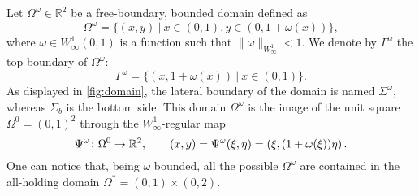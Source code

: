 \documentclass[final,hidelinks]{siamart1116Arxiv}
\numberwithin{theorem}{section}
\newcommand{\st}{{\ | \ }} %
\newcommand{\rd}[1]{%
  \IfEqCase{#1}{%
    {x}{\xi}%
    {y}{\eta}%
    {(x,y)}{(\xi,\eta)}%
  }[\PackageError{\rd}{Opzione non definita per rd: #1}{}]%
}
\newcommand{\allhold}{{\Omega^*}}
\begin{document}
Let $\Omega^\omega\in\mathbb{R}^2$ be a free-boundary, bounded domain defined as
\begin{equation}\label{eq:domain}
    \Omega^\omega = \{(x,y) \st x\in (0,1), y\in (0,1+\omega(x))\},
\end{equation}
where $\omega\in W^1_\infty(0,1)$ is a function such that $\|\omega\|_{W^1_\infty}<1$.
We denote by $\Gamma^\omega$ the top boundary of $\Omega^\omega$:
\begin{equation}
    \Gamma^\omega = \{(x,1+\omega(x)) \st x\in(0,1)\}.
\end{equation}
As displayed in \cref{fig:domain}, the lateral boundary of the domain is named $\Sigma^\omega$, whereas $\Sigma_b$ is the bottom side.
This domain $\Omega^\omega$ is the image of the unit square $\Omega^0=(0,1)^2$ through the $W^1_\infty$-regular map
\begin{equation}
    \Psi^\omega \colon \Omega^0 \to \mathbb{R}^2, \qquad (x,y) = \Psi^\omega(\rd{x},\rd{y}) = \left(\rd{x} , (1+\omega(\rd{x}))\rd{y}\right).
\end{equation}
One can notice that, being $\omega$ bounded, all the possible $\Omega^\omega$ are contained in the all-holding domain $\allhold=(0,1)\times(0,2)$.
\end{document}
